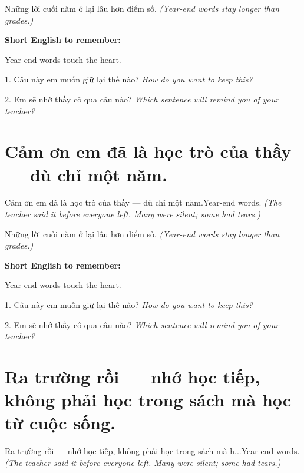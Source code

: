 \begin{baihoc}
Những lời cuối năm ở lại lâu hơn điểm số.
\textit{(Year-end words stay longer than grades.)}
\end{baihoc}

\begin{ghinhoanh}
\textbf{Short English to remember:}

Year-end words touch the heart.

\end{ghinhoanh}

\begin{tuhocnhanh}
1. Câu này em muốn giữ lại thế nào? \textit{How do you want to keep this?}

2. Em sẽ nhớ thầy cô qua câu nào? \textit{Which sentence will remind you of your teacher?}
\end{tuhocnhanh}
\ngancach


\section{Cảm ơn em đã là học trò của thầy — dù chỉ một năm.}
\begin{truyen}{Cảm ơn em đã là học trò của thầy — dù chỉ một năm.}{Year-end words.}
\textit{(The teacher said it before everyone left. Many were silent; some had tears.)}
\end{truyen}

\begin{baihoc}
Những lời cuối năm ở lại lâu hơn điểm số.
\textit{(Year-end words stay longer than grades.)}
\end{baihoc}

\begin{ghinhoanh}
\textbf{Short English to remember:}

Year-end words touch the heart.

\end{ghinhoanh}

\begin{tuhocnhanh}
1. Câu này em muốn giữ lại thế nào? \textit{How do you want to keep this?}

2. Em sẽ nhớ thầy cô qua câu nào? \textit{Which sentence will remind you of your teacher?}
\end{tuhocnhanh}
\ngancach


\section{Ra trường rồi — nhớ học tiếp, không phải học trong sách mà học từ cuộc sống.}
\begin{truyen}{Ra trường rồi — nhớ học tiếp, không phải học trong sách mà h...}{Year-end words.}
\textit{(The teacher said it before everyone left. Many were silent; some had tears.)}
\end{truyen}

